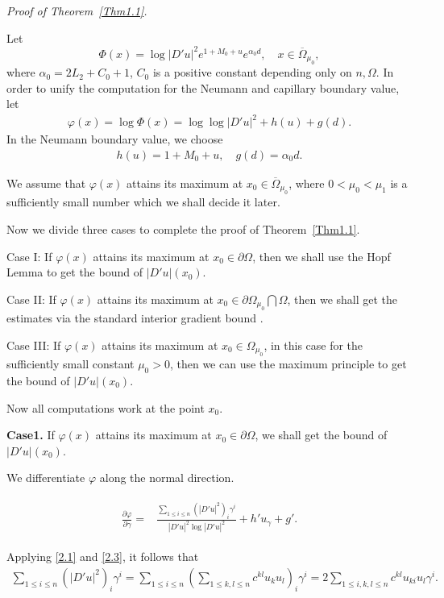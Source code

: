 \documentclass[11pt]{amsart}
\numberwithin{equation}{section}
\begin{document}
{\em Proof of  Theorem~\ref{Thm1.1}.}

Let $$\Phi(x)=\log|D'u|^2e^{1+M_0+u}e^{\alpha_0 d}, \quad  x \in \overline \Omega_{\mu_{0}},$$ where $\alpha_0=2L_2+C_0+1 $, $C_0$ is  a positive constant depending only on $n,\Omega$.
In order to unify the computation for the Neumann and capillary boundary value, let
\begin{align}\label{3.1}
 \varphi(x)= \log \Phi(x) =\log\log|D'u|^2+h(u)+g(d).
 \end{align}
In the Neumann boundary value, we choose
\begin{align}\label{3.1a}
 h(u)=1+M_0+u, \quad g(d)=\alpha_0 d.
 \end{align}


 We assume that
$\varphi(x)$ attains its maximum at $x_0 \in \overline \Omega_{\mu_{0}}$, where $0<\mu_0<\mu_1$ is a sufficiently small number which we shall decide it  later.

Now we divide three cases to complete the proof of  Theorem~\ref{Thm1.1}.

Case I: If $\varphi(x)$ attains its maximum at $x_0 \in \partial\Omega$, then we shall use the Hopf Lemma to get the bound of $|D'u|(x_0)$.

Case II: If $\varphi(x)$ attains its maximum at $x_0 \in\partial\Omega_{\mu_0}\bigcap\Omega$, then we shall get the estimates via the standard interior gradient bound \cite{GT01}.

Case III:  If $\varphi(x)$ attains its maximum at $x_0 \in \Omega_{\mu_0}$, in this case for the sufficiently small constant $\mu_0>0$,  then we can use the maximum principle to get the bound of $|D'u|(x_0)$.

Now  all computations work at the point $x_0$.


{\bf Case1.} If  $\varphi(x)$ attains its maximum at $x_0\in \partial \Omega$, we shall get the bound of $|D'u|(x_0)$.


We differentiate $\varphi$ along the normal direction.

\begin{align}\label{3.2}
\begin{split}
\frac{\partial\varphi}{\partial\gamma}=&\frac{\sum_{1\leq i\leq n}(|D'u|^2)_i\gamma^i}{|D'u|^2\log|D'u|^2}+h'u_{\gamma}+g'.
\end{split}
\end{align}

Applying \eqref{2.1} and \eqref{2.3}, it follows that
\begin{align}\label{3.3}
\sum_{1\leq i\leq n}(|D'u|^2)_i\gamma^i=\sum_{1\leq i\leq n}(\sum_{1\leq k,l\leq n}c^{kl}u_{k}u_l)_i\gamma^i
=2\sum_{1\leq i,k,l\leq n}c^{kl}u_{ki}u_l\gamma^i.
\end{align}
\end{document}
